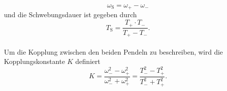 \begin{enumerate}
        \begin{equation}
          \omega_\text{S}=\omega_+ - \omega_-
        \end{equation}
        und die Schwebungsdauer ist gegeben durch
        \begin{equation}
          \label{eq:schwebungsdauer}
          T_\text{S}=\frac{T_+\cdot T_-}{T_+-T_-}.
        \end{equation}
        \\
        Um die Kopplung zwischen den beiden Pendeln zu beschreiben, wird die Kopplungskonstante $K$ definiert
        \begin{equation}
          \label{eq:kopplungskonstante}
          K=\frac{\omega_-^2-\omega_+^2}{\omega_-^2+\omega_+^2}=\frac{T_-^2-T_+^2}{T_-^2+T_+^2}.
        \end{equation}
\end{enumerate}